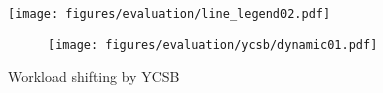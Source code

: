 \begin{figure}[t]
    \centering
    \begin{minipage}{0.8\linewidth}
        \centering
        \texttt{[image: figures/evaluation/line\_legend02.pdf]}
        \vspace{-5mm}
    \end{minipage}
    \begin{minipage}{0.95\linewidth}
        \centering
        \begin{subfigure}{0.95\linewidth}
            \texttt{[image: figures/evaluation/ycsb/dynamic01.pdf]}
            \vspace{-4mm}
        \end{subfigure}
    \end{minipage}
    \vspace{-4mm}
    \caption{Workload shifting by YCSB}
    \label{fig:evaluation.dynamic}
    \vspace{-6mm}
\end{figure}





